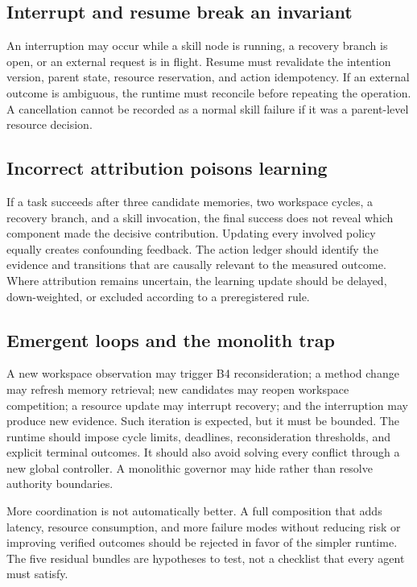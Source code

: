 \subsection{Interrupt and resume break an invariant}
\label{subsec:ch18-interrupt-resume}

An interruption may occur while a skill node is running, a recovery branch is open, or an external request is in flight. Resume must revalidate the intention version, parent state, resource reservation, and action idempotency. If an external outcome is ambiguous, the runtime must reconcile before repeating the operation. A cancellation cannot be recorded as a normal skill failure if it was a parent-level resource decision.

\subsection{Incorrect attribution poisons learning}
\label{subsec:ch18-learning-attribution-failure}

If a task succeeds after three candidate memories, two workspace cycles, a recovery branch, and a skill invocation, the final success does not reveal which component made the decisive contribution. Updating every involved policy equally creates confounding feedback. The action ledger should identify the evidence and transitions that are causally relevant to the measured outcome. Where attribution remains uncertain, the learning update should be delayed, down-weighted, or excluded according to a preregistered rule.

\subsection{Emergent loops and the monolith trap}
\label{subsec:ch18-loops-monolith}

A new workspace observation may trigger B4 reconsideration; a method change may refresh memory retrieval; new candidates may reopen workspace competition; a resource update may interrupt recovery; and the interruption may produce new evidence. Such iteration is expected, but it must be bounded. The runtime should impose cycle limits, deadlines, reconsideration thresholds, and explicit terminal outcomes. It should also avoid solving every conflict through a new global controller. A monolithic governor may hide rather than resolve authority boundaries.

\begin{warningbox}
More coordination is not automatically better. A full composition that adds latency, resource consumption, and more failure modes without reducing risk or improving verified outcomes should be rejected in favor of the simpler runtime. The five residual bundles are hypotheses to test, not a checklist that every agent must satisfy.
\end{warningbox}

